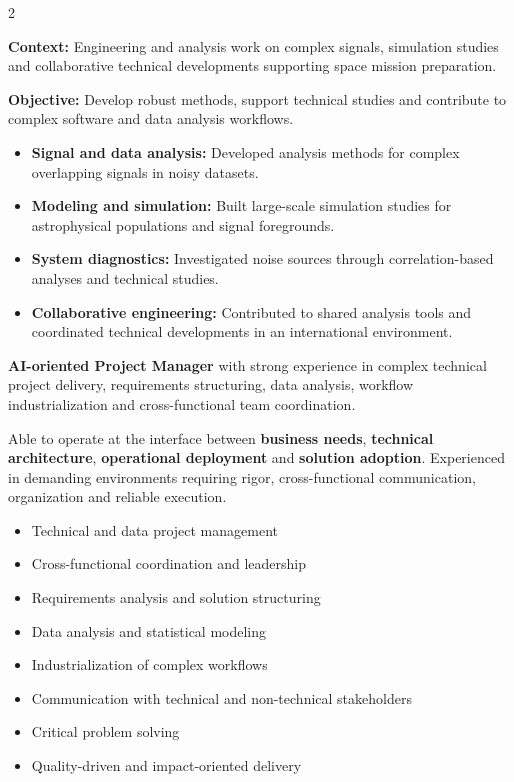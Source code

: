 \documentclass[8pt,a4paper,ragged2e,withhyper]{altacv}
\begin{document}
\begin{paracol}{2}
\divider


\textbf{Context:} Engineering and analysis work on complex signals, simulation studies and collaborative technical developments supporting space mission preparation.

\textbf{Objective:} Develop robust methods, support technical studies and contribute to complex software and data analysis workflows.

\begin{itemize}
\item \textbf{Signal and data analysis:} Developed analysis methods for complex overlapping signals in noisy datasets.
\item \textbf{Modeling and simulation:} Built large-scale simulation studies for astrophysical populations and signal foregrounds.
\item \textbf{System diagnostics:} Investigated noise sources through correlation-based analyses and technical studies.
\item \textbf{Collaborative engineering:} Contributed to shared analysis tools and coordinated technical developments in an international environment.
\end{itemize}

\switchcolumn


\textbf{AI-oriented Project Manager} with strong experience in complex technical project delivery, requirements structuring, data analysis, workflow industrialization and cross-functional team coordination.

Able to operate at the interface between \textbf{business needs}, \textbf{technical architecture}, \textbf{operational deployment} and \textbf{solution adoption}. Experienced in demanding environments requiring rigor, cross-functional communication, organization and reliable execution.


\begin{itemize}
\item Technical and data project management
\item Cross-functional coordination and leadership
\item Requirements analysis and solution structuring
\item Data analysis and statistical modeling
\item Industrialization of complex workflows
\item Communication with technical and non-technical stakeholders
\item Critical problem solving
\item Quality-driven and impact-oriented delivery
\end{itemize}


\end{paracol}
\end{document}
